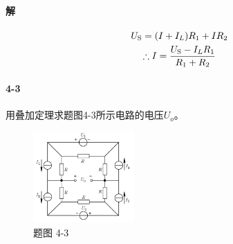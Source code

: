 \documentclass[hyperref, UTF8]{ctexart}
\newcommand{\source}{{\rm S}}
\begin{document}
\paragraph{解}
\begin{gather*}
U_\source = (I+I_L)R_1+IR_2 \\
\therefore I=\frac{U_\source-I_LR_1}{R_1+R_2}
\end{gather*}

\paragraph{4-3}\label{4-3}
用叠加定理求题图4-3所示电路的电压$U_o$。

\begin{figure}[!htb]
\centering
\includegraphics[width=0.344\textwidth]{p4-3.png}
\caption*{题图 4-3}
\end{figure}
\end{document}
